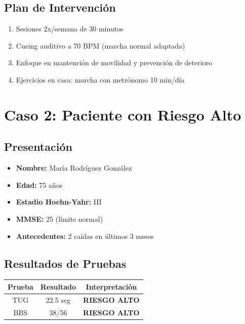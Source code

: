 \documentclass[12pt,a4paper,spanish,oneside]{book}
\begin{document}
\subsection{Plan de Intervención}

\begin{enumerate}
  \item Sesiones 2x/semana de 30 minutos
  \item Cueing auditivo a 70 BPM (marcha normal adaptada)
  \item Enfoque en mantención de movilidad y prevención de deterioro
  \item Ejercicios en casa: marcha con metrónomo 10 min/día
\end{enumerate}

\section{Caso 2: Paciente con Riesgo Alto}

\subsection{Presentación}

\begin{itemize}
  \item \textbf{Nombre:} María Rodríguez González
  \item \textbf{Edad:} 75 años
  \item \textbf{Estadio Hoehn-Yahr:} III
  \item \textbf{MMSE:} 25 (límite normal)
  \item \textbf{Antecedentes:} 2 caídas en últimos 3 meses
\end{itemize}

\subsection{Resultados de Pruebas}

\begin{table}[h]
  \centering
  \begin{tabular}{|c|c|c|}
    \hline
    \textbf{Prueba} & \textbf{Resultado} & \textbf{Interpretación} \\
    \hline
    TUG & 22.5 seg & \textbf{RIESGO ALTO} \\
    \hline
    BBS & 38/56 & \textbf{RIESGO ALTO} \\
    \hline
  \end{tabular}
\end{table}
\end{document}
